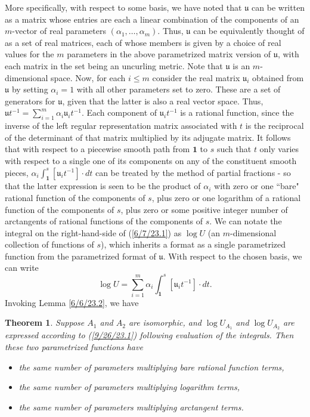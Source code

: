 \documentclass{amsart}
\numberwithin{equation}{section}
\newtheorem{theorem}{Theorem}
\theoremstyle{definition}
\numberwithin{theorem}{section}
\begin{document}
More specifically, with respect to some basis, we have noted that $\mathfrak{u}$ can be written as a matrix whose entries are each a linear combination of the components of an $m$-vector of real parameters $(\alpha_1, \dots, \alpha_m)$.   Thus, $\mathfrak{u}$ can be equivalently thought of as a set of real matrices, each of whose members is given by a choice of real values for the $m$ parameters in the above parametrized matrix version of $\mathfrak{u}$, with each matrix in the set being an uncurling metric.   Note that $\mathfrak{u}$ is an $m$-dimensional space.    Now, for each $i\le m$ consider the real matrix  $\mathfrak{u}_i$ obtained from $\mathfrak{u}$ by setting $\alpha_i =1$ with all other parameters set to zero.  These are a set of generators for $\mathfrak{u}$, given that the latter is also a real vector space. Thus, $\mathfrak{u}t^{-1} = \sum_{i=1}^m \alpha_i \mathfrak{u}_i t^{-1}$.   Each component of $\mathfrak{u}_i t^{-1}$ is a rational function, since the inverse of the left regular representation matrix associated with $t$ is the reciprocal of the determinant of that matrix multiplied by its adjugate matrix.  It follows that  with respect to a piecewise smooth path from $\mathbf{1}$ to $s$ such that $t$ only varies with respect to a single one of its components on any of the constituent smooth pieces, $\alpha_i \int_{\mathbf{1}}^s [\mathfrak{u}_i t^{-1}]\cdot dt$ can be treated by the method of partial fractions - so that the latter expression is seen to be the product of $\alpha_i$ with zero or one ``bare" rational function of the components of $s$, plus zero or one logarithm of a rational function of the components of $s$, plus zero or some positive integer number of arctangents of rational functions of the components of $s$.  We can notate the integral on the right-hand-side of (\ref{6/7/23.1}) as $\log  U$ (an $m$-dimensional collection of functions of $s$), which inherits a format as a single parametrized function from the parametrized format of $\mathfrak{u}$.  With respect to the chosen basis, we can write \begin{equation}\label{9/26/23.1} \log  U =\sum_{i=1}^m \alpha_i \int_{\mathbf{1}}^s [\mathfrak{u}_i t^{-1}]\cdot dt.\end{equation}  Invoking Lemma \ref{6/6/23.2}, we have

\begin{theorem} \label{6/6/23.3} Suppose $A_1$ and $A_2$ are isomorphic, and $\log U_{A_1}$ and $\log U_{A_2}$ are expressed according to (\ref{9/26/23.1}) following evaluation of the integrals.  Then these two parametrized functions have
\begin{itemize}\item   the same number of parameters multiplying bare rational function terms, \item  the same number of parameters multiplying logarithm terms,  \item  the same number of parameters multiplying arctangent terms.\end{itemize}
\end{theorem}
\end{document}
